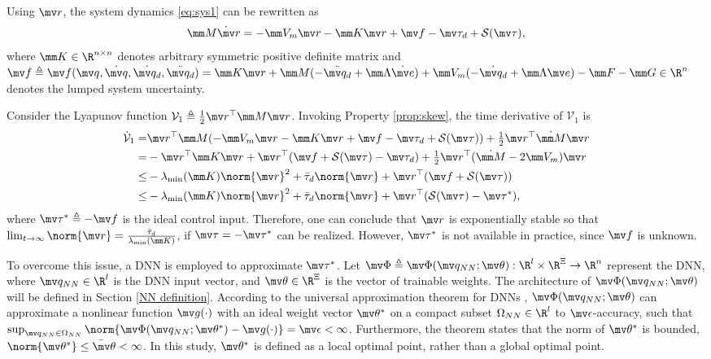 \documentclass[lettersize,journal]{IEEEtran}
\newcommand*{\sat}{\mathcal{S}}
\newcommand*{\fe}{\mv r}
\newcommand*{\q}{\mv q}
\newcommand*{\dq}{\dot{\mv q}}
\newcommand*{\dqd}{\dot{\mv q_d}}
\newcommand*{\ddqd}{\ddot{\mv q_d}}
\newcommand*{\NN}{\mv\Phi}
\newcommand*{\wth}{\mv\theta}
\begin{document}
Using $\fe$, the system dynamics \eqref{eq:sys1} can be rewritten as
\begin{equation}
    \mm M \dot\fe
    =
    -\mm V_m \fe
    -\mm K \fe
    + \mv f
    -\mv \tau_d + \sat(\mv\tau)
    ,
\end{equation}
where $\mm K\in\R^{n\times n}$ denotes arbitrary symmetric positive definite matrix and $
    \mv f\triangleq \mv f(\q,\dq,\dqd,\ddqd)
    =
    \mm K \fe
    +\mm M(-\ddqd+\mm\Lambda\dot{\mv e})
    +
    \mm V_m(-\dqd+\mm\Lambda\mv e)
    -
    \mm F
    -
    \mm G
    \in\R^n
$ denotes the lumped system uncertainty.

Consider the Lyapunov function $\mathcal V_1\triangleq \tfrac{1}{2}\fe^\top \mm M\fe$. 
Invoking Property \ref{prop:skew}, the time derivative of $\mathcal V_1$ is
\begin{equation}
    \begin{aligned}
        \dot{\mathcal V}_1
        =&
        \fe^\top \mm M (
            -\mm V_m \fe -\mm K \fe + \mv f
            -\mv \tau_d + \sat(\mv\tau)
        )
        +
        \tfrac{1}{2}
        \fe^\top \dot{\mm M}\fe
        \\
        =&
        -
        \fe^\top \mm K \fe 
        +
        \fe^\top (
            \mv f+\sat(\mv\tau)
            -\mv \tau_d
        )
        +
        \tfrac{1}{2}
        \fe^\top(\dot{\mm M}- 2\mm V_m)\fe
        \\
        \le&
        -\lambda_\text{min}(\mm K)\norm{\fe}^2
        +
        \bar\tau_d\norm{\fe}
        +
        \fe^\top (\mv f+\sat(\mv \tau))
        \\
        \le&
        -\lambda_\text{min}(\mm K)\norm{\fe}^2
        +
        \bar\tau_d\norm{\fe}
        +
        \fe^\top (\sat(\mv\tau)-\mv\tau^*)
        ,
    \end{aligned}
    \label{eq:lya1:dot1}
\end{equation}
where $\mv\tau^*\triangleq -\mv f$ is the ideal control input. 
Therefore, one can conclude that $\fe$ is exponentially stable so that $\lim_{t\to\infty}\norm{\fe}=\tfrac{\bar\tau_d}{\lambda_\text{min}(\mm K)}$, if $\mv \tau=-\mv\tau^*$ can be realized.
However, $\mv \tau^*$ is not available in practice, since $\mv f$ is unknown.

To overcome this issue, a DNN is employed to approximate $\mv\tau^*$.
Let $\NN\triangleq\NN(\q_{NN};\wth): \R^{l}\times\R^{\Xi}\to\R^{n}$ represent the DNN, where $\q_{NN}\in\R^{l}$ is the DNN input vector, and $\wth\in\R^{\Xi}$ is the vector of trainable weights.
The architecture of $\NN(\q_{NN};\wth)$ will be defined in Section \ref{NN definition}.
According to the universal approximation theorem for DNNs \cite{RN33}, $\NN(\q_{NN};\wth)$ can approximate a nonlinear function $\mv g(\cdot)$ with an ideal weight vector $\wth^*$ on a compact subset $\Omega_{NN}\in\R^{l}$ to $\mv\epsilon$-accuracy, such that $\sup_{\q_{NN}\in\Omega_{NN}}\norm{ \NN(\q_{NN};\wth^*) - \mv g(\cdot)} = \mv\epsilon < \infty$.
Furthermore, the theorem states that the norm of $\wth^*$ is bounded, \ie $\norm{\wth^*}\le \bar\wth<\infty$.
In this study, $\wth^*$ is defined as a local optimal point, rather than a global optimal point.
\end{document}
